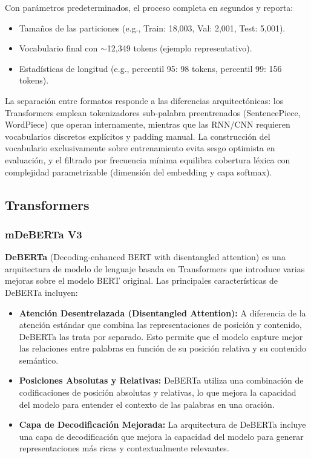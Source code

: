 \documentclass[paper=letter, fontsize=11pt, draft=false]{scrartcl}
\numberwithin{equation}{section} %
\numberwithin{figure}{section} %
\numberwithin{table}{section} %
\numberwithin{subsection}{section}
\begin{document}
Con parámetros predeterminados, el proceso completa en segundos y reporta:
\begin{itemize}
    \item Tamaños de las particiones (e.g., Train: 18,003, Val: 2,001, Test: 5,001).
    \item Vocabulario final con $\sim$12,349 tokens (ejemplo representativo).
    \item Estadísticas de longitud (e.g., percentil 95: 98 tokens, percentil 99: 156 tokens).
\end{itemize}

La separación entre formatos responde a las diferencias arquitectónicas: los Transformers emplean tokenizadores sub-palabra preentrenados (SentencePiece, WordPiece) que operan internamente, mientras que las RNN/CNN requieren vocabularios discretos explícitos y padding manual. La construcción del vocabulario exclusivamente sobre entrenamiento evita sesgo optimista en evaluación, y el filtrado por frecuencia mínima equilibra cobertura léxica con complejidad parametrizable (dimensión del embedding y capa softmax).

\newpage

\subsection{Transformers}

\subsubsection{mDeBERTa V3}

\textbf{DeBERTa} (Decoding-enhanced BERT with disentangled attention) es una arquitectura de modelo de lenguaje basada en Transformers que introduce varias mejoras sobre el modelo BERT original. Las principales características de DeBERTa incluyen:
\begin{itemize}
    \item \textbf{Atención Desentrelazada (Disentangled Attention):} A diferencia de la atención estándar que combina las representaciones de posición y contenido, DeBERTa las trata por separado. Esto permite que el modelo capture mejor las relaciones entre palabras en función de su posición relativa y su contenido semántico.
    \item \textbf{Posiciones Absolutas y Relativas:} DeBERTa utiliza una combinación de codificaciones de posición absolutas y relativas, lo que mejora la capacidad del modelo para entender el contexto de las palabras en una oración.
    \item \textbf{Capa de Decodificación Mejorada:} La arquitectura de DeBERTa incluye una capa de decodificación que mejora la capacidad del modelo para generar representaciones más ricas y contextualmente relevantes.
\end{itemize}
\end{document}
